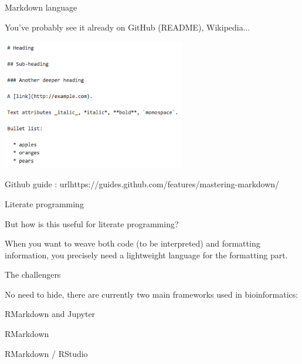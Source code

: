 \begin{frame}{Markdown language}

You've probably see it already on GitHub (README), Wikipedia... 

\centering\includegraphics[width=8cm]{07_notebook/images/markdown.png}

Github guide : url{https://guides.github.com/features/mastering-markdown/}
\end{frame}


%
%
%
%

\begin{frame}{Literate programming}

But how is this useful for literate programming? \newline

When you want to weave both code (to be interpreted) and formatting information, you precisely need a lightweight language for the formatting part.
\end{frame}

\begin{frame}{The challengers}

No need to hide, there are currently two main frameworks used in bioinformatics:

RMarkdown and Jupyter
\end{frame}

\begin{frame}{RMarkdown}

\huge{RMarkdown / RStudio} 

\end{frame}

